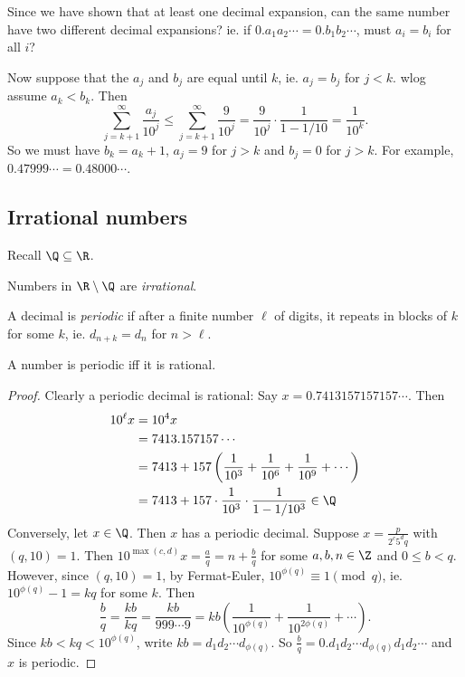 \documentclass[a4paper]{article}
\begin{document}
Since we have shown that at least one decimal expansion, can the same number have two different decimal expansions? ie. if $0.a_1a_2\cdots = 0.b_1b_2\cdots$, must $a_i = b_i$ for all $i$?

Now suppose that the $a_j$ and $b_j$ are equal until $k$, ie. $a_j = b_j$ for $j < k$. wlog assume $a_k < b_k$. Then
\[
  \sum_{j = k + 1}^\infty \frac{a_j}{10^j} \leq \sum_{j = k+1}^\infty \frac{9}{10^j} = \frac{9}{10^j}\cdot \frac{1}{1 - 1/10} = \frac{1}{10^k}.
\]
So we must have $b_k = a_k + 1$, $a_j = 9$ for $j > k$ and $b_j = 0$ for $j > k$. For example, $0.47999\cdots = 0.48000\cdots$.

\subsection{Irrational numbers}
Recall $\Q\subseteq \R$.
\begin{defi}
  Numbers in $\R\setminus \Q$ are \emph{irrational}.
\end{defi}

\begin{defi}
  A decimal is \emph{periodic} if after a finite number $\ell$ of digits, it repeats in blocks of $k$ for some $k$, ie. $d_{n + k} = d_n$ for $n > \ell$.
\end{defi}

\begin{prop}
  A number is periodic iff it is rational.
\end{prop}

\begin{proof}
  Clearly a periodic decimal is rational: Say $x = 0.7413157157157\cdots$. Then
  \begin{align*}
    10^\ell x &= 10^4x\\
    &= 7413.157157\cdots \\
    &= 7413 + 157\left(\frac{1}{10^3} + \frac{1}{10^6} + \frac{1}{10^9} + \cdots\right)\\
    &= 7413 + 157\cdot \frac{1}{10^3}\cdot \frac{1}{1 - 1/10^3}\in \Q
  \end{align*}
  Conversely, let $x\in \Q$. Then $x$ has a periodic decimal. Suppose $x = \frac{p}{2^c5^dq}$ with $(q, 10) = 1$. Then $10^{\max(c, d)}x = \frac{a}{q} = n + \frac{b}{q}$ for some $a, b, n\in \Z$ and $0\leq b < q$. However, since $(q, 10) = 1$, by Fermat-Euler, $10^{\phi(q)}\equiv 1\pmod q$, ie. $10^{\phi(q)} - 1 = kq$ for some $k$. Then
  \[
    \frac{b}{q} = \frac{kb}{kq} = \frac{kb}{999\cdots 9} = kb\left(\frac{1}{10^{\phi(q)}} + \frac{1}{10^{2\phi(q)}} + \cdots \right).
  \]
  Since $kb < kq < 10^{\phi(q)}$, write $kb = d_1d_2\cdots d_{\phi(q)}$. So $\frac{b}{q} = 0.d_1d_2\cdots d_{\phi(q)}d_1d_2\cdots$ and $x$ is periodic.
\end{proof}
\end{document}
